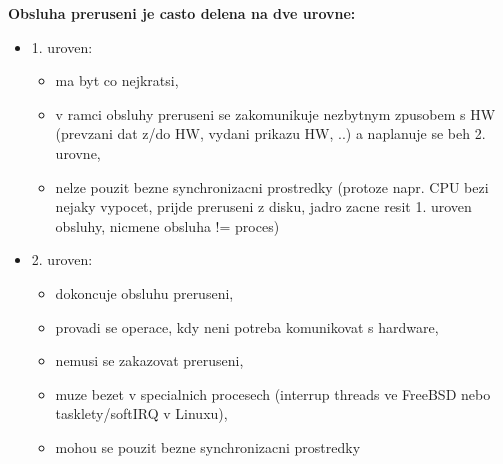 \documentclass[a4paper, 11pt]{article}
\begin{document}
\noindent\textbf{Obsluha preruseni je casto delena na dve urovne:}
\begin{itemize}
    \item 1. uroven:
    \begin{itemize}
        \item ma byt co nejkratsi,
        \item v ramci obsluhy preruseni se zakomunikuje nezbytnym zpusobem s HW (prevzani dat z/do HW, vydani prikazu HW, ..) a naplanuje se beh 2. urovne,
        \item nelze pouzit bezne synchronizacni prostredky (protoze napr. CPU bezi nejaky vypocet, prijde preruseni z disku, jadro zacne resit 1. uroven obsluhy, nicmene obsluha != proces)
    \end{itemize}
    \item 2. uroven:
    \begin{itemize}
        \item dokoncuje obsluhu preruseni,
        \item provadi se operace, kdy neni potreba komunikovat s hardware,
        \item nemusi se zakazovat preruseni,
        \item muze bezet v specialnich procesech (interrup threads ve FreeBSD nebo tasklety/softIRQ v Linuxu),
        \item mohou se pouzit bezne synchronizacni prostredky \\
    \end{itemize}
\end{itemize}
\end{document}
